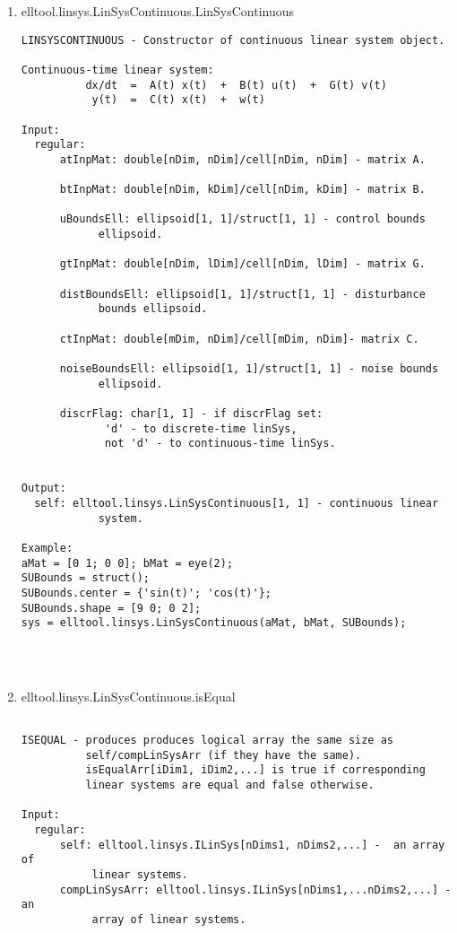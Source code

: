 \begin{enumerate}
\begin{lstlisting}
\end{lstlisting}
\fontfamily{\familydefault}
\selectfont
\item {elltool.linsys.LinSysContinuous.LinSysContinuous}
\selectfont
\begin{lstlisting}
LINSYSCONTINUOUS - Constructor of continuous linear system object.

Continuous-time linear system:
          dx/dt  =  A(t) x(t)  +  B(t) u(t)  +  G(t) v(t)
           y(t)  =  C(t) x(t)  +  w(t)

Input:
  regular:
      atInpMat: double[nDim, nDim]/cell[nDim, nDim] - matrix A.

      btInpMat: double[nDim, kDim]/cell[nDim, kDim] - matrix B.

      uBoundsEll: ellipsoid[1, 1]/struct[1, 1] - control bounds
            ellipsoid.

      gtInpMat: double[nDim, lDim]/cell[nDim, lDim] - matrix G.

      distBoundsEll: ellipsoid[1, 1]/struct[1, 1] - disturbance
            bounds ellipsoid.

      ctInpMat: double[mDim, nDim]/cell[mDim, nDim]- matrix C.

      noiseBoundsEll: ellipsoid[1, 1]/struct[1, 1] - noise bounds
            ellipsoid.

      discrFlag: char[1, 1] - if discrFlag set:
             'd' - to discrete-time linSys,
             not 'd' - to continuous-time linSys.


Output:
  self: elltool.linsys.LinSysContinuous[1, 1] - continuous linear
            system.

Example:
aMat = [0 1; 0 0]; bMat = eye(2);
SUBounds = struct();
SUBounds.center = {'sin(t)'; 'cos(t)'};
SUBounds.shape = [9 0; 0 2];
sys = elltool.linsys.LinSysContinuous(aMat, bMat, SUBounds);




\end{lstlisting}
\fontfamily{\familydefault}
\selectfont
\item {elltool.linsys.LinSysContinuous.isEqual}
\selectfont
\begin{lstlisting}

ISEQUAL - produces produces logical array the same size as
          self/compLinSysArr (if they have the same).
          isEqualArr[iDim1, iDim2,...] is true if corresponding
          linear systems are equal and false otherwise.

Input:
  regular:
      self: elltool.linsys.ILinSys[nDims1, nDims2,...] -  an array of
           linear systems.
      compLinSysArr: elltool.linsys.ILinSys[nDims1,...nDims2,...] - an
           array of linear systems.


\end{lstlisting}
\end{enumerate}
